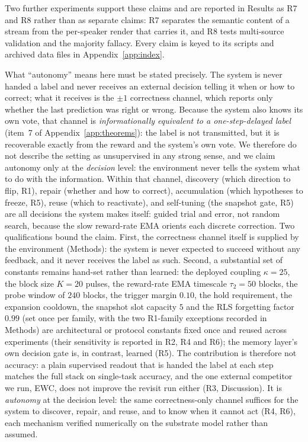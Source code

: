\documentclass[preprint,12pt]{elsarticle}
\begin{document}
Two further experiments support these claims and are reported in Results as
R7 and R8 rather than as separate claims: R7 separates the semantic content
of a stream from the per-speaker render that carries it, and R8 tests
multi-source validation and the majority fallacy. Every claim is keyed to
its scripts and archived data files in Appendix~\ref{app:index}.

What ``autonomy'' means here must be stated precisely. The system is never
handed a label and never receives an external decision telling it when or
how to correct; what it receives is the $\pm1$ correctness channel, which
reports only whether the last prediction was right or wrong. Because the
system also knows its own vote, that channel is \emph{informationally
equivalent to a one-step-delayed label} (item~7 of
Appendix~\ref{app:theorems}): the label is not transmitted, but it is
recoverable exactly from the reward and the system's own vote. We therefore
do not describe the setting as unsupervised in any strong sense, and we
claim autonomy only at the \emph{decision} level: the environment never
tells the system what to do with the information. Within that channel,
discovery (which direction to flip, R1), repair (whether and how to
correct), accumulation (which hypotheses to freeze, R5), reuse (which to
reactivate), and self-tuning (the snapshot gate, R5) are all decisions the
system makes itself: guided trial and error, not random search, because
the slow reward-rate EMA orients each discrete correction. Two
qualifications bound the claim. First, the correctness channel itself
is supplied by the environment (Methods): the system is never expected to
succeed without any feedback, and it never receives the label as such.
Second, a substantial set of constants remains hand-set rather than learned:
the deployed coupling $\kappa=25$, the block size $K=20$ pulses, the
reward-rate EMA timescale $\tau_2=50$ blocks, the probe window of $240$
blocks, the trigger margin $0.10$, the hold requirement, the expansion
cooldown, the snapshot slot capacity $5$ and the RLS forgetting factor
$0.99$ (set once per family, with the two R1-family exceptions recorded in
Methods) are architectural or protocol constants fixed once and reused across
experiments (their sensitivity is reported in R2, R4 and R6); the memory
layer's own decision gate is, in contrast, learned (R5). The contribution is
therefore not accuracy: a plain supervised readout that is handed the label at
each step matches the full stack on single-task accuracy, and the one external
competitor we run, EWC, does not improve the revisit run either (R3,
Discussion). It is \emph{autonomy} at the
decision level: the same correctness-only channel suffices for the system to
discover, repair, and reuse, and to know when it cannot act (R4, R6), each
mechanism verified numerically on the substrate model rather than assumed.
\end{document}
